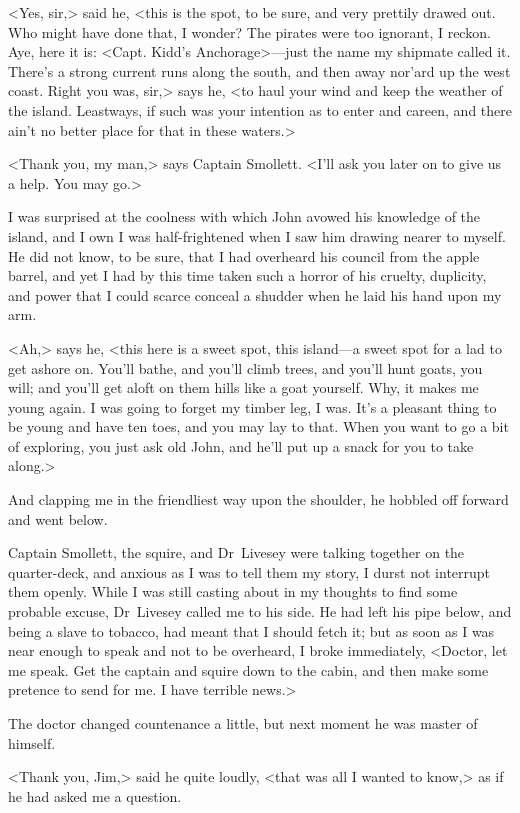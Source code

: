 <Yes, sir,> said he, <this is the spot, to be sure, and very prettily drawed out. Who might have done that, I wonder? The pirates were too ignorant, I reckon. Aye, here it is: <Capt. Kidd's Anchorage>—just the name my shipmate called it. There's a strong current runs along the south, and then away nor'ard up the west coast. Right you was, sir,> says he, <to haul your wind and keep the weather of the island. Leastways, if such was your intention as to enter and careen, and there ain't no better place for that in these waters.>

<Thank you, my man,> says Captain Smollett. <I'll ask you later on to give us a help. You may go.>

I was surprised at the coolness with which John avowed his knowledge of the island, and I own I was half-frightened when I saw him drawing nearer to myself. He did not know, to be sure, that I had overheard his council from the apple barrel, and yet I had by this time taken such a horror of his cruelty, duplicity, and power that I could scarce conceal a shudder when he laid his hand upon my arm.

<Ah,> says he, <this here is a sweet spot, this island—a sweet spot for a lad to get ashore on. You'll bathe, and you'll climb trees, and you'll hunt goats, you will; and you'll get aloft on them hills like a goat yourself. Why, it makes me young again. I was going to forget my timber leg, I was. It's a pleasant thing to be young and have ten toes, and you may lay to that. When you want to go a bit of exploring, you just ask old John, and he'll put up a snack for you to take along.>

And clapping me in the friendliest way upon the shoulder, he hobbled off forward and went below.

Captain Smollett, the squire, and Dr~Livesey were talking together on the quarter-deck, and anxious as I was to tell them my story, I durst not interrupt them openly. While I was still casting about in my thoughts to find some probable excuse, Dr~Livesey called me to his side. He had left his pipe below, and being a slave to tobacco, had meant that I should fetch it; but as soon as I was near enough to speak and not to be overheard, I broke immediately, <Doctor, let me speak. Get the captain and squire down to the cabin, and then make some pretence to send for me. I have terrible news.>

The doctor changed countenance a little, but next moment he was master of himself.

<Thank you, Jim,> said he quite loudly, <that was all I wanted to know,> as if he had asked me a question.

